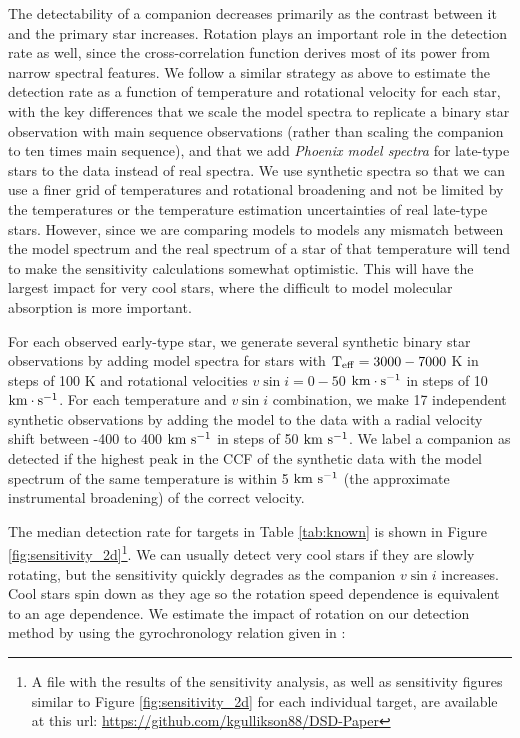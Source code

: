 \documentclass{emulateapj}
\begin{document}
The detectability of a companion decreases primarily as the contrast between it and the primary star increases. Rotation plays an important role in the detection rate as well, since the cross-correlation function derives most of its power from narrow spectral features. We follow a similar strategy as above to estimate the detection rate as a function of temperature and rotational velocity for each star, with the key differences that we scale the model spectra to replicate a binary star observation with main sequence observations (rather than scaling the companion to ten times main sequence), and that we add \emph{Phoenix model spectra} for late-type stars to the data instead of real spectra. We use synthetic spectra so that we can use a finer grid of temperatures and rotational broadening and not be limited by the temperatures or the temperature estimation uncertainties of real late-type stars. However, since we are comparing models to models any mismatch between the model spectrum and the real spectrum of a star of that temperature will tend to make the sensitivity calculations somewhat optimistic. This will have the largest impact for very cool stars, where the difficult to model molecular absorption is more important.

For each observed early-type star, we generate several synthetic binary star observations by adding model spectra for stars with $\rm T_{eff} = 3000 - 7000$ K in steps of 100 K and rotational velocities $v\sin{i} = 0 - 50$ $\rm km \cdot s^{-1}$ in steps of 10 $\rm km \cdot s^{-1}$. For each temperature and $v\sin{i}$ combination, we make 17 independent synthetic observations by adding the model to the data with a radial velocity shift between -400 to 400 $\rm km \ s^{-1}$ in steps of 50 $\rm km \ s^{-1}$. We label a companion as detected if the highest peak in the CCF of the synthetic data with the model spectrum of the same temperature is within 5 $\rm km \ s^{-1}$ (the approximate instrumental broadening) of the correct velocity. 

The median detection rate for targets in Table \ref{tab:known} is shown in Figure \ref{fig:sensitivity_2d}\footnote{A file with the results of the sensitivity analysis, as well as sensitivity figures similar to Figure \ref{fig:sensitivity_2d} for each individual target, are available at this url: \url{https://github.com/kgullikson88/DSD-Paper}}. We can usually detect very cool stars if they are slowly rotating, but the sensitivity quickly degrades as the companion $v\sin{i}$ increases. Cool stars spin down as they age \citep{Barnes2003} so the rotation speed dependence is equivalent to an age dependence. We estimate the impact of rotation on our detection method by using the gyrochronology relation given in \cite{Barnes2010b}: 
\end{document}
